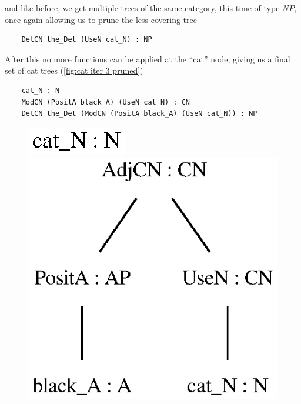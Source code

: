 and like before, we get multiple trees of the same category, this time of type $NP$, once again allowing us to prune the less covering tree
\begin{lstlisting}
    DetCN the_Det (UseN cat_N) : NP
\end{lstlisting}

After this no more functions can be applied at the ``cat'' node, giving us a final set of cat trees (\autoref{fig:cat iter 3 pruned})
\begin{lstlisting}
    cat_N : N
    ModCN (PositA black_A) (UseN cat_N) : CN
    DetCN the_Det (ModCN (PositA black_A) (UseN cat_N)) : NP
\end{lstlisting}

\begin{figure}
    \centering
        {\includegraphics[scale=0.75]{thesis/figure/black_cats/cat_N_gf.eps}}
        {\includegraphics[scale=0.75]{thesis/figure/black_cats/black_cat_CN_gf.eps}}

\end{figure}
